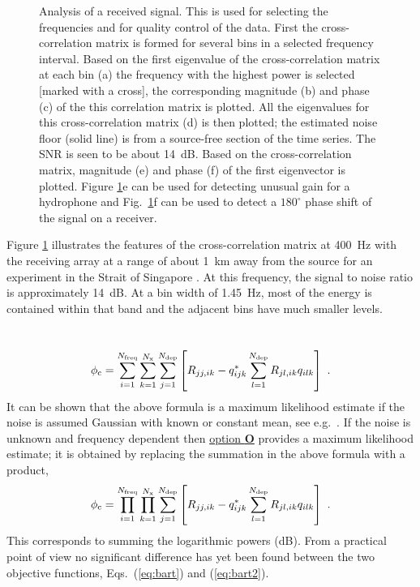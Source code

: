 \documentclass{saclantc}
\begin{document}
\begin{figure}
\centerline{}
\caption{Analysis of a received signal. This is used for selecting
 the frequencies and for quality control of the data. First the
 cross-correlation matrix is formed for several bins in a selected frequency
 interval. 
Based on the first eigenvalue of the cross-correlation matrix at each bin 
(a) the frequency with the highest power is selected [marked with a cross], 
the corresponding magnitude (b) and phase
 (c) of the this correlation matrix is plotted. 
All the eigenvalues for this
 cross-correlation matrix (d) is then plotted; the estimated noise floor (solid line) is from
 a source-free section of the time series. The SNR is seen to be about 14~dB. 
 Based on the cross-correlation matrix, magnitude (e) and phase (f) of the
 first eigenvector is plotted. 
Figure \ref{covplot}e can be used for detecting unusual gain for a hydrophone and
 Fig.\ \ref{covplot}f can be used to detect a $180^\circ$ phase shift of the signal on a receiver.}
\label{covplot}
\end{figure}

Figure \ref{covplot} illustrates the features of the cross-correlation matrix
at 400~Hz with the receiving array at a range of about 1~km away 
from the source for an experiment in the Strait of Singapore \cite{purnima98e}. 
At this frequency, the signal to noise ratio is
approximately 14~dB.  At a bin width of 1.45~Hz, most of the energy is
contained within that band and the adjacent bins have much smaller
levels.

\
 \begin{equation}
\phi_{\rm c}=
 \sum^{N _{\rm freq}}_{i=1} 
 \sum^{N _{\rm x   }}_{k=1}
 \sum^{N _{\rm dep }}_{j=1}
\left[
R_{jj,ik}-      q_{ijk}^* 
 \sum^{N _{\rm dep }}_{l=1} R_{jl,ik} q_{ilk} \right]~.
 \label{eq:bart}
\end{equation}
It can be shown that the above formula is a maximum likelihood
estimate if the noise is assumed Gaussian with known or constant
mean, see e.g.\ \cite{gerstoft:asa98}. If the noise is unknown and
frequency dependent then 
 \underline{option {\bf O}} provides a maximum likelihood
estimate; it is obtained by replacing the summation in the above formula with a
product, 
\begin{equation}
\phi_{\rm c}=
\prod^{N_{\rm freq}}_{i=1} 
\prod^{N_{\rm    x}}_{k=1}
\sum^ {N_{\rm dep }}_{j=1}
\left[
R_{jj,ik}-      q_{ijk}^* \sum^{N _{\rm dep}}_{l=1} R_{jl,ik} q_{ilk} \right]~.
\label{eq:bart2}
\end{equation}
This corresponds to summing the logarithmic powers (dB). From a
practical point of view no significant difference has yet been
found between the two objective functions, Eqs.\ (\ref{eq:bart}) and 
 (\ref{eq:bart2}).
\end{document}
